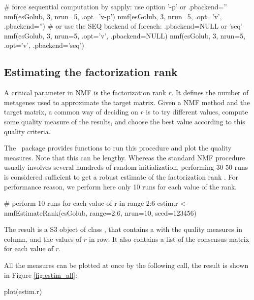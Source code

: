 \documentclass[a4paper]{article}
\newcommand{\nmfpack}{\code{NMF}\ }
\begin{document}
\begin{Schunk}
\begin{Sinput}
 # force sequential computation by sapply: use option '-p' or .pbackend=''
 nmf(esGolub, 3, nrun=5, .opt='v-p')
 nmf(esGolub, 3, nrun=5, .opt='v', .pbackend='')
 # or use the SEQ backend of foreach: .pbackend=NULL or 'seq'
 nmf(esGolub, 3, nrun=5, .opt='v', .pbackend=NULL)
 nmf(esGolub, 3, nrun=5, .opt='v', .pbackend='seq')
\end{Sinput}
\end{Schunk}


\subsection{Estimating the factorization rank}
A critical parameter in NMF is the factorization rank $r$. 
It defines the number of metagenes used to approximate the target matrix.
Given a NMF method and the target matrix, a common way of deciding on $r$ is to 
try different values, compute some quality measure of the results, and choose 
the best value according to this quality criteria. 

The \nmfpack package provides functions to run this procedure and plot the 
quality measures.
Note that this can be lengthy.
Whereas the standard NMF procedure usually involves several hundreds of random 
initialization, performing 30-50 runs is considered sufficient to get a robust 
estimate of the factorization rank \cite{Brunet04, Hutchins2008}.
For performance reason, we perform here only 10 runs for each value of the rank.

\begin{Schunk}
\begin{Sinput}
 # perform 10 runs for each value of r in range 2:6
 estim.r <- nmfEstimateRank(esGolub, range=2:6, nrun=10, seed=123456)
\end{Sinput}
\end{Schunk}

The result is a S3 object of class , that contains a 
 with the quality measures in column, and the values of $r$ in 
row. It also contains a list of the consensus matrix for each value of $r$.

All the measures can be plotted at once by the following call, the result is shown 
in Figure \ref{fig:estim_all}:
\begin{Schunk}
\begin{Sinput}
 plot(estim.r)
\end{Sinput}
\end{Schunk}
\end{document}
